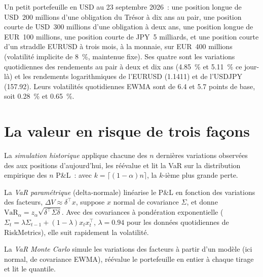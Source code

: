 \begin{example}[Le portefeuille]\label{ex:rc:market-risk-measures:book}
Un petit portefeuille en USD au 23 septembre 2026~: une position longue de USD~200 millions d'une obligation du Trésor à dix ans au pair,
une position courte de USD~300 millions d'une obligation à deux ans, une position longue de EUR~100 millions, une position courte de JPY~5 milliards, et une position courte
d'un straddle EURUSD à trois mois, à la monnaie, sur EUR~400 millions (volatilité implicite de 8~\%, maintenue
fixe). Ses quatre  sont les variations quotidiennes des rendements au pair à deux et dix ans (4.85~\%
et 5.11~\% ce jour-là) et les rendements logarithmiques de l'EURUSD (1.1411) et de l'USDJPY (157.92). Leurs volatilités
quotidiennes EWMA sont de 6.4 et 5.7 points de base, soit 0.28~\% et 0.65~\%.
\end{example}

\section{La valeur en risque de trois façons}

\begin{definition}\label{def:rc:market-risk-measures:hs}
La \emph{simulation historique} applique chacune des $n$ dernières
variations observées des  aux positions d'aujourd'hui, les réévalue et lit la VaR sur
la distribution empirique des $n$ P\&L~: avec $k = \lceil(1-\alpha)n\rceil$, la $k$-ième plus grande perte.
\end{definition}

\begin{definition}\label{def:rc:market-risk-measures:param}
La \emph{VaR paramétrique} (delta-normale) linéarise
le P\&L en fonction des variations des facteurs, $\Delta V\approx\delta^\top x$, suppose $x$ normal de covariance $\Sigma$,
et donne $\mathrm{VaR}_\alpha = z_\alpha\sqrt{\delta^\top\Sigma\delta}$. Avec des covariances à pondération exponentielle
($\Sigma_t = \lambda\Sigma_{t-1}+(1-\lambda)x_tx_t^\top$, $\lambda = 0.94$ pour les données quotidiennes de RiskMetrics), elle
suit rapidement la volatilité.
\end{definition}

\begin{definition}\label{def:rc:market-risk-measures:mc}
La \emph{VaR Monte Carlo} simule les variations des facteurs à partir d'un modèle
(ici normal, de covariance EWMA), réévalue le portefeuille en entier à chaque tirage
et lit le quantile.
\end{definition}

